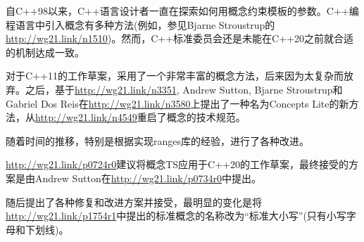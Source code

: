 自C++98以来，C++语言设计者一直在探索如何用概念约束模板的参数。C++编程语言中引入概念有多种方法(例如，参见Bjarne Stroustrup的\url{http://wg21.link/n1510})。然而，C++标准委员会还是未能在C++20之前就合适的机制达成一致。

对于C++11的工作草案，采用了一个非常丰富的概念方法，后来因为太复杂而放弃。之后，基于\url{http://wg21.link/n3351}, Andrew Sutton, Bjarne Stroustrup和Gabriel Dos Reis在\url{http://wg21.link/n3580}上提出了一种名为Concepts Lite的新方法，从\url{http://wg21.link/n4549}重启了概念的技术规范。

随着时间的推移，特别是根据实现ranges库的经验，进行了各种改进。

\url{http://wg21.link/p0724r0}建议将概念TS应用于C++20的工作草案，最终接受的方案是由Andrew Sutton在\url{http://wg21.link/p0734r0}中提出。

随后提出了各种修复和改进方案并接受，最明显的变化是将\url{http://wg21.link/p1754r1}中提出的标准概念的名称改为“标准大小写”(只有小写字母和下划线)。